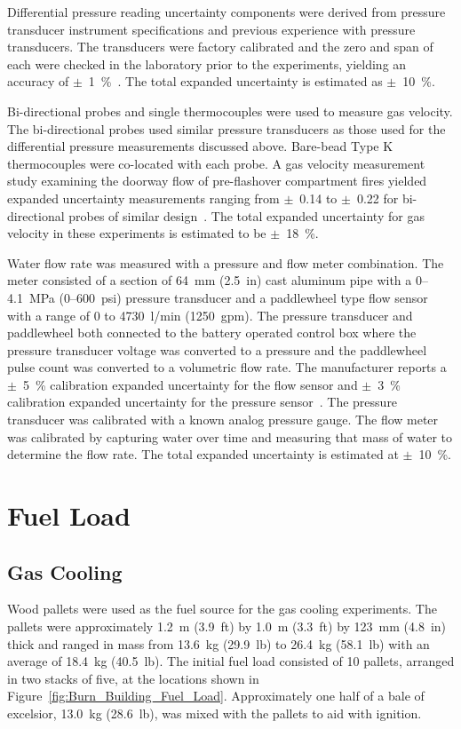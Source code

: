 \documentclass[12pt,oneside]{book}
\begin{document}
Differential pressure reading uncertainty components were derived from pressure transducer instrument specifications and previous experience with pressure transducers. The transducers were factory calibrated and the zero and span of each were checked in the laboratory prior to the experiments, yielding an accuracy of $\pm$~1~\%~\cite{Setra:2002}. The total expanded uncertainty is estimated as $\pm$~10~\%.

Bi-directional probes and single thermocouples were used to measure gas velocity. The bi-directional probes used similar pressure transducers as those used for the differential pressure measurements discussed above. Bare-bead Type K thermocouples were co-located with each probe. A gas velocity measurement study examining the doorway flow of pre-flashover compartment fires yielded expanded uncertainty measurements ranging from $\pm$~0.14 to $\pm$~0.22 for bi-directional probes of similar design~\cite{Bryant:FSJ2009}. The total expanded uncertainty for gas velocity in these experiments is estimated to be $\pm$~18~\%.

Water flow rate was measured with a pressure and flow meter combination. The meter consisted of a section of 64~mm (2.5~in) cast aluminum pipe with a 0--4.1~MPa (0--600~psi) pressure transducer and a paddlewheel type flow sensor with a range of 0 to 4730~l/min (1250~gpm). The pressure transducer and paddlewheel both connected to the battery operated control box where the pressure transducer voltage was converted to a pressure and the paddlewheel pulse count was converted to a volumetric flow rate.  The manufacturer reports a $\pm$~5~\% calibration expanded uncertainty for the flow sensor and $\pm$~3~\% calibration expanded uncertainty for the pressure sensor~\cite{Akron:2009}. The pressure transducer was calibrated with a known analog pressure gauge. The flow meter was calibrated by capturing water over time and measuring that mass of water to determine the flow rate. The total expanded uncertainty is estimated at $\pm$~10~\%.

\section{Fuel Load}
\label{sec:fuel_load}

\subsection{Gas Cooling}
\label{sec:Fuel_Load_Gas_Cooling}

Wood pallets were used as the fuel source for the gas cooling experiments. The pallets were approximately 1.2~m (3.9~ft) by 1.0~m (3.3~ft) by 123~mm (4.8~in) thick and ranged in mass from 13.6~kg (29.9~lb) to 26.4~kg (58.1~lb) with an average of 18.4~kg (40.5~lb). The initial fuel load consisted of 10 pallets, arranged in two stacks of five, at the locations shown in Figure~\ref{fig:Burn_Building_Fuel_Load}. Approximately one half of a bale of excelsior, 13.0~kg (28.6~lb), was mixed with the pallets to aid with ignition.
\end{document}
